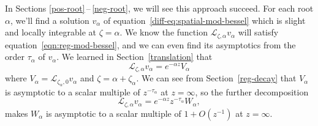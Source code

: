 \documentclass{article}
\newcommand{\fracderiv}[3]{\partial^{#1}_{#2, #3}}
\newcommand{\laplace}{\mathcal{L}}
\begin{document}
In Sections \ref{pos-root}\,--\,\ref{neg-root}, we will see this approach succeed. For each root $\alpha$, we'll find a solution $v_\alpha$ of equation~\eqref{diff-eq:spatial-mod-bessel} which is slight and locally integrable at $\zeta = \alpha$. We know the function $\laplace_{\zeta, \alpha} v_\alpha$ will satisfy equation~\eqref{eqn:reg-mod-bessel}, and we can even find its asymptotics from the order $\tau_\alpha$ of $v_\alpha$. We learned in Section~\ref{translation} that
\[ \laplace_{\zeta, \alpha} v_\alpha = e^{-\alpha z} V_\alpha \]
where $V_\alpha = \laplace_{\zeta_\alpha, 0} v_\alpha$ and $\zeta = \alpha + \zeta_\alpha$. We can see from Section~\ref{reg-decay} that $V_\alpha$ is asymptotic to a scalar multiple of $z^{ - \tau_\alpha}$ at $z = \infty$, so the further decomposition
\[ \laplace_{\zeta, \alpha} v_\alpha = e^{-\alpha z} z^{-\tau_\alpha} W_\alpha, \]
makes $W_\alpha$ is asymptotic to a scalar multiple of $1+O(z^{-1})$ at $z = \infty$.
\end{document}
